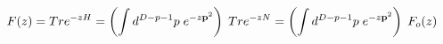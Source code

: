 \begin{equation}\label{fcorrect}
F(z) = Tr e^{- z H} = \left( \int d^{D - p- 1}p \; 
e^{- z {\bf p}^2} \right) \; Tr e^{- z N} 
= \left( \int d^{D - p- 1}p \; 
e^{- z {\bf p}^2} \right) \; F_o(z) 
\end{equation}

